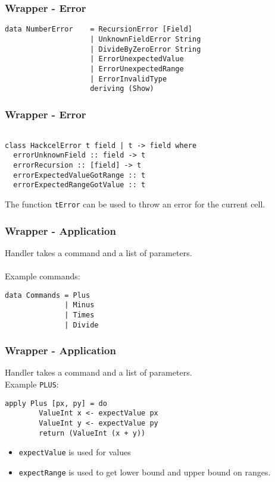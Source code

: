 \documentclass{beamer}
\begin{document}
  \begin{frame}[fragile]
  		\frametitle{Wrapper - Error}
		  		\begin{verbatim}
data NumberError    = RecursionError [Field]
                    | UnknownFieldError String
                    | DivideByZeroError String
                    | ErrorUnexpectedValue
                    | ErrorUnexpectedRange
                    | ErrorInvalidType
                    deriving (Show)
  		\end{verbatim}
  \end{frame}
    \begin{frame}[fragile]
  		\frametitle{Wrapper - Error}
		  		\begin{verbatim}

class HackcelError t field | t -> field where
  errorUnknownField :: field -> t
  errorRecursion :: [field] -> t
  errorExpectedValueGotRange :: t
  errorExpectedRangeGotValue :: t
  		\end{verbatim}
  		The function \texttt{tError} can be used to throw an error for the current cell.
  \end{frame}
	    \begin{frame}[fragile]
  		\frametitle{Wrapper - Application}
  		Handler takes a command and a list of parameters.
  		\\\\
  		Example commands:
  		\begin{verbatim}
data Commands = Plus
              | Minus
              | Times
              | Divide        
  		\end{verbatim}
  \end{frame}  
  \begin{frame}[fragile]
  \frametitle{Wrapper - Application}
  		Handler takes a command and a list of parameters.
  		\\
  		Example \texttt{PLUS}:
  		\begin{verbatim}
apply Plus [px, py] = do
		ValueInt x <- expectValue px 
		ValueInt y <- expectValue py
		return (ValueInt (x + y))
  		\end{verbatim}
  		\begin{itemize}
  		\item \texttt{expectValue} is used for values
  		\item \texttt{expectRange} is used to get lower bound and upper bound on ranges.
  		\end{itemize}
  \end{frame}  
\end{document}
